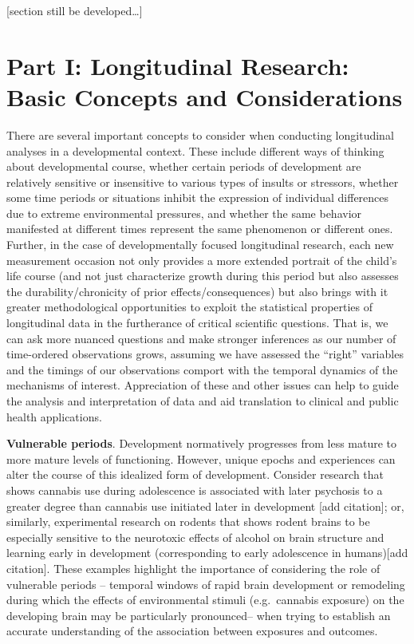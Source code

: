\documentclass[
  letterpaper,
  DIV=11,
  numbers=noendperiod]{scrartcl}
\begin{document}
{[}section still be developed\ldots{]}

\hypertarget{part-i-longitudinal-research-basic-concepts-and-considerations}{%
\section{Part I: Longitudinal Research: Basic Concepts and
Considerations}\label{part-i-longitudinal-research-basic-concepts-and-considerations}}

\label{sec:headings} There are several important concepts to consider
when conducting longitudinal analyses in a developmental context. These
include different ways of thinking about developmental course, whether
certain periods of development are relatively sensitive or insensitive
to various types of insults or stressors, whether some time periods or
situations inhibit the expression of individual differences due to
extreme environmental pressures, and whether the same behavior
manifested at different times represent the same phenomenon or different
ones. Further, in the case of developmentally focused longitudinal
research, each new measurement occasion not only provides a more
extended portrait of the child's life course (and not just characterize
growth during this period but also assesses the durability/chronicity of
prior effects/consequences) but also brings with it greater
methodological opportunities to exploit the statistical properties of
longitudinal data in the furtherance of critical scientific questions.
That is, we can ask more nuanced questions and make stronger inferences
as our number of time-ordered observations grows, assuming we have
assessed the ``right'' variables and the timings of our observations
comport with the temporal dynamics of the mechanisms of interest.
Appreciation of these and other issues can help to guide the analysis
and interpretation of data and aid translation to clinical and public
health applications.

\textbf{Vulnerable periods}. Development normatively progresses from
less mature to more mature levels of functioning. However, unique epochs
and experiences can alter the course of this idealized form of
development. Consider research that shows cannabis use during
adolescence is associated with later psychosis to a greater degree than
cannabis use initiated later in development {[}add citation{]}; or,
similarly, experimental research on rodents that shows rodent brains to
be especially sensitive to the neurotoxic effects of alcohol on brain
structure and learning early in development (corresponding to early
adolescence in humans){[}add citation{]}. These examples highlight the
importance of considering the role of vulnerable periods -- temporal
windows of rapid brain development or remodeling during which the
effects of environmental stimuli (e.g.~cannabis exposure) on the
developing brain may be particularly pronounced-- when trying to
establish an accurate understanding of the association between exposures
and outcomes.
\end{document}
